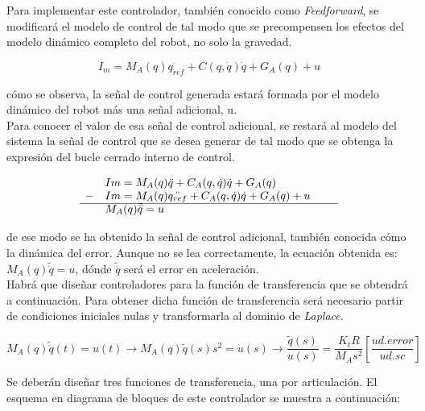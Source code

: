 Para implementar este controlador, también conocido como \textit{Feedforward}, se modificará el modelo de control de tal modo que se precompensen los efectos del modelo dinámico completo del robot, no solo la gravedad.

\begin{equation}
I_m= M_{A}(q)\ddot{q_{ref}} + C(q,\dot{q})\dot{q} + G_{A}(q) + u
\end{equation}

cómo se observa, la señal de control generada estará formada por el modelo dinámico del robot más una señal adicional, u.\\

Para conocer el valor de esa señal de control adicional, se restará al modelo del sistema la señal de control que se desea generar de tal modo que se obtenga la expresión del bucle cerrado interno de control.

\begin{equation}
\begin{array}{llll}
& Im=M_{A}(q)\ddot{q} + C_{A}(q,\dot{q})\dot{q} + G_{A}(q) \\

- & Im=M_{A}(q)\ddot{q_{ref}} + C_{A}(q,\dot{q})\dot{q} + G_{A}(q) + u \\

\cline{1-4}

& M_{A}(q)\tilde{\ddot{q}} = u & &
\end{array}
\end{equation}

de ese modo se ha obtenido la señal de control adicional, también conocida cómo la dinámica del error. Aunque no se lea correctamente, la ecuación obtenida es: $M_{A}(q)\tilde{\ddot{q}} = u$, dónde $\tilde{\ddot{q}}$ será el error en aceleración. \\

Habrá que diseñar controladores para la función de transferencia que se obtendrá a continuación. Para obtener dicha función de transferencia será necesario partir de condiciones iniciales nulas y transformarla al dominio de \textit{Laplace}.

\begin{equation}
M_{A}(q)\tilde{\ddot{q}}(t) = u(t) \rightarrow M_{A}(q)\tilde{q}(s)s^{2} = u(s) \rightarrow \frac{\tilde{q}(s)}{u(s)}=\frac{K_{t}R}{M_{A}s^{2}}[\frac{ud.error}{ud.sc}]
\end{equation}



Se deberán diseñar tres funciones de transferencia, una por articulación. El esquema en diagrama de bloques de este controlador se muestra a continuación:




